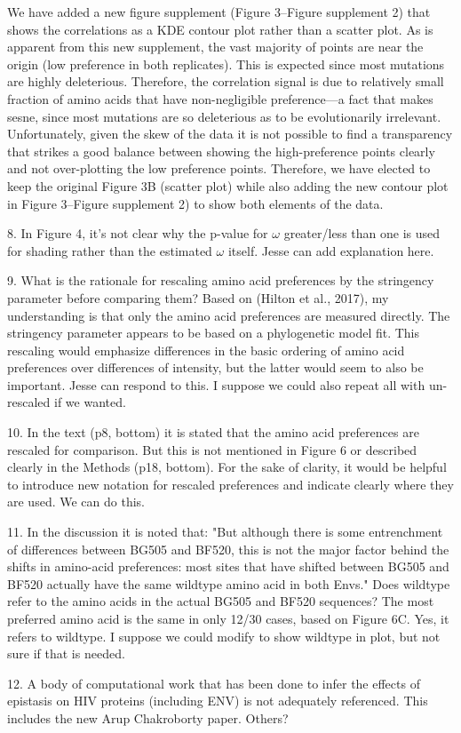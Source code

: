 \documentclass[11pt, oneside]{article}   	%
\begin{document}
{\color{black}
We have added a new figure supplement (Figure 3--Figure supplement 2) that shows the correlations as a KDE contour plot rather than a scatter plot.
As is apparent from this new supplement, the vast majority of points are near the origin (low preference in both replicates). 
This is expected since most mutations are highly deleterious.
Therefore, the correlation signal is due to relatively small fraction of amino acids that have non-negligible preference---a fact that makes sesne, since most mutations are so deleterious as to be evolutionarily irrelevant.
Unfortunately, given the skew of the data it is not possible to find a transparency that strikes a good balance between showing the high-preference points clearly and not over-plotting the low preference points.
Therefore, we have elected to keep the original Figure 3B (scatter plot) while also adding the new contour plot in Figure 3--Figure supplement 2) to show both elements of the data.
}

8. In Figure 4, it's not clear why the p-value for $\omega$ greater/less than one is used for shading rather than the estimated $\omega$ itself. 
{\color{red}
Jesse can add explanation here.}

9. What is the rationale for rescaling amino acid preferences by the stringency parameter before comparing them? Based on (Hilton et al., 2017), my understanding is that only the amino acid preferences are measured directly. The stringency parameter appears to be based on a phylogenetic model fit. This rescaling would emphasize differences in the basic ordering of amino acid preferences over differences of intensity, but the latter would seem to also be important. 
{\color{red}
Jesse can respond to this. I suppose we could also repeat all with un-rescaled if we wanted.}

10. In the text (p8, bottom) it is stated that the amino acid preferences are rescaled for comparison. But this is not mentioned in Figure 6 or described clearly in the Methods (p18, bottom). For the sake of clarity, it would be helpful to introduce new notation for rescaled preferences and indicate clearly where they are used. 
{\color{red}
We can do this.}

11. In the discussion it is noted that: "But although there is some entrenchment of differences between BG505 and BF520, this is not the major factor behind the shifts in amino-acid preferences: most sites that have shifted between BG505 and BF520 actually have the same wildtype amino acid in both Envs." Does wildtype refer to the amino acids in the actual BG505 and BF520 sequences? The most preferred amino acid is the same in only 12/30 cases, based on Figure 6C. 
{\color{red}
Yes, it refers to wildtype. I suppose we could modify to show wildtype in plot, but not sure if that is needed.}

12. A body of computational work that has been done to infer the effects of epistasis on HIV proteins (including ENV) is not adequately referenced. 
{\color{red}
This includes the new Arup Chakroborty paper. Others?}
\end{document}
